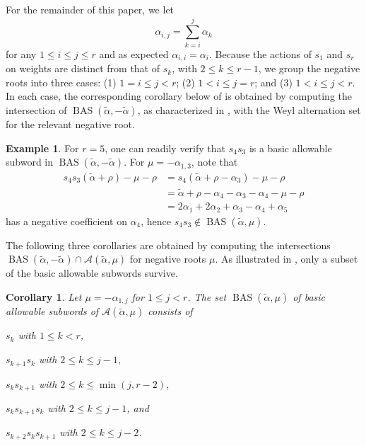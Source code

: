 \documentclass{amsart}
\newtheorem{corollary}[theorem]{Corollary}
\theoremstyle{definition}
\newtheorem{example}[theorem]{Example}
\DeclareMathOperator{\BAS}{BAS}
\newcommand{\hroot}{\tilde{\alpha}}
\newcommand{\calA}{\mathcal{A}}
\begin{document}
For the remainder of this paper, we let
\[\alpha_{i,j} = \sum_{k=i}^j \alpha_k\] for any $1 \le i \leq j \le r$ and as expected $\alpha_{i,i}=\alpha_i$.
Because the actions of $s_1$ and $s_r$ on weights are distinct from that of $s_k$, with $2 \leq k \leq r-1$, we group the negative roots into three cases: 
(1) $1=i \leq j < r$; 
(2) $1<i\leq j=r$; and 
(3) $1<i\leq j<r$. 
In each case, the corresponding corollary below of  is obtained by computing the intersection of $\BAS(\hroot,-\hroot)$, as characterized in , with the Weyl alternation set for the relevant negative root. 


\begin{example}
\label{ex:bas_survival}
    For $r=5$, one can readily verify that $s_4s_3$ is a basic allowable subword in $\BAS(\hroot,-\hroot)$. For $\mu=-\alpha_{1,3}$, note that \begin{align*}
        s_4s_3(\hroot+\rho)-\mu-\rho&=s_4(\hroot+\rho-\alpha_3)-\mu-\rho\\
        &=\hroot+\rho-\alpha_4-\alpha_3-\alpha_4-\mu-\rho\\
        &=2\alpha_1+2\alpha_2+\alpha_3-\alpha_4+\alpha_5
\end{align*} 
 has a negative coefficient on $\alpha_4$, hence $s_4s_3\notin\BAS(\hroot,\mu)$.
\end{example}

The following three corollaries are obtained by computing the intersections $\BAS(\hroot,-\hroot)\cap\calA(\hroot,\mu)$ for negative roots $\mu$. As illustrated in , only a subset of the basic allowable subwords survive.

\begin{corollary}\label{cor:BAS1j}
Let $\mu = -\alpha_{1,j}$ for $1 \leq j < r$.
The set $\BAS(\hroot, \mu)$ of basic allowable subwords of $\mathcal{A}(\hroot, \mu)$ consists of 
\begin{enumerate}
\noindent \begin{minipage}{0.45\textwidth}
    \item[(a)] $s_k$ with $1 \leq k < r$,
    \item[(b)] $s_{k+1}s_k$ with $2 \leq k \leq j-1$,
    \item[(c)] $s_ks_{k+1}$ with $2 \leq k \leq \min(j,r-2)$,
\end{minipage}
\begin{minipage}{0.45\textwidth}
    \item[(d)] $s_ks_{k+1}s_k$ with $2 \leq k \leq j-1$, and 
    \item[(e)] $s_{k+2}s_ks_{k+1}$ with $2 \leq k \leq j-2$.
\end{minipage}
\end{enumerate}
\end{corollary}
\end{document}
